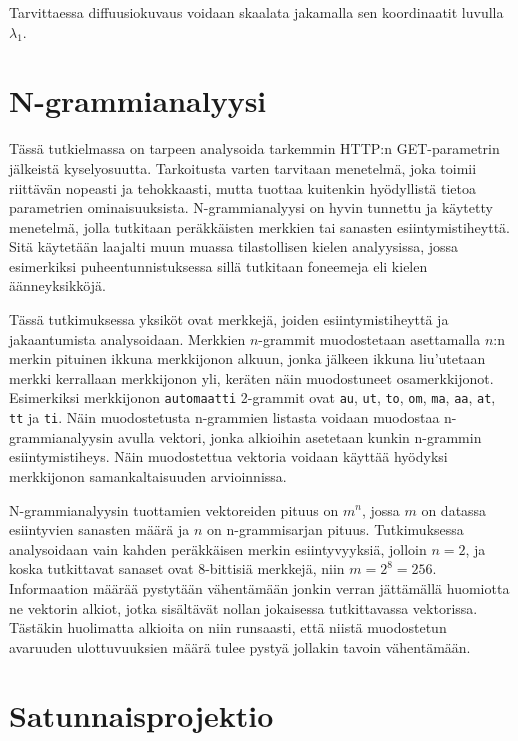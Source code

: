 Tarvittaessa diffuusiokuvaus voidaan skaalata jakamalla sen koordinaatit luvulla $\lambda_1$.

\section{N-grammianalyysi}


Tässä tutkielmassa on tarpeen analysoida tarkemmin HTTP:n GET-parametrin jälkeistä kyselyosuutta. Tarkoitusta varten tarvitaan menetelmä, joka toimii riittävän nopeasti ja tehokkaasti, mutta tuottaa kuitenkin hyödyllistä tietoa parametrien ominaisuuksista. N-\-grammianalyysi on hyvin tunnettu ja käytetty menetelmä, jolla tutkitaan 
peräkkäisten merkkien tai sanasten esiintymistiheyttä. Sitä käytetään laajalti muun muassa tilastollisen kielen analyysissa, jossa esimerkiksi puheentunnistuksessa sillä tutkitaan foneemeja eli kielen äänneyksikköjä. 

Tässä tutkimuksessa yksiköt ovat merkkejä, joiden esiintymistiheyttä ja jakaantumista analysoidaan. Merkkien $n$-grammit muodostetaan asettamalla $n$:n merkin pituinen ikkuna merkkijonon alkuun, jonka jälkeen ikkuna liu'utetaan merkki kerrallaan merkkijonon yli, keräten näin muodostuneet osamerkkijonot. Esimerkiksi merkkijonon \texttt{automaatti} 2-grammit ovat
\texttt{au},
\texttt{ut},
\texttt{to},
\texttt{om},
\texttt{ma},
\texttt{aa},
\texttt{at},
\texttt{tt} ja
\texttt{ti}.
Näin muodostetusta n-grammien listasta voidaan muodostaa n-grammianalyysin avulla vektori, jonka alkioihin asetetaan kunkin n-grammin esiintymistiheys. Näin muodostettua vektoria voidaan käyttää hyödyksi merkkijonon samankaltaisuuden arvioinnissa.

N-grammianalyysin tuottamien vektoreiden pituus on $m^n$, jossa $m$ on datassa esiintyvien sanasten määrä ja $n$ on n-grammisarjan pituus. Tutkimuksessa analysoidaan vain kahden peräkkäisen merkin esiintyvyyksiä, 
jolloin $n=2$, ja koska tutkittavat sanaset ovat 8-bittisiä merkkejä, niin $m=2^8=256$. Informaation määrää pystytään vähentämään jonkin verran jättämällä huomiotta ne vektorin alkiot, jotka sisältävät nollan jokaisessa tutkittavassa vektorissa. Tästäkin huolimatta alkioita on niin runsaasti, että niistä muodostetun avaruuden ulottuvuuksien määrä tulee pystyä jollakin tavoin vähentämään. 

\section{Satunnaisprojektio}

